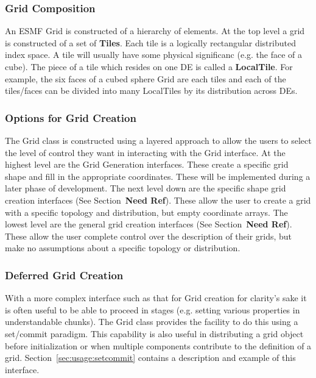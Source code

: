 \subsubsection{Grid Composition}
\label{sec:gridcomp}

An ESMF Grid is constructed of a hierarchy of elements. At the top
level a grid is constructed of a set of {\bf Tiles}. Each tile is a logically
rectangular distributed index space. A tile will usually have some
physical significanc (e.g. the face of a cube). The piece of a tile
which resides on one DE is called a {\bf LocalTile}. For example, the six
faces of a cubed sphere Grid are each tiles and each of 
the tiles/faces can be divided into many LocalTiles by its
distribution across DEs. 

\subsubsection{Options for Grid Creation} 

The Grid class is constructed using a layered approach to allow the 
users to select the level of control they want in interacting with
the Grid interface. At the highest level are the Grid Generation interfaces. 
These create a specific grid shape and fill in the appropriate coordinates. 
These will be implemented during a later phase of development. The
next level down are the specific shape grid creation interfaces (See Section~\textbf{Need Ref}). 
These allow the user to create a grid with a specific topology and 
distribution, but empty coordinate arrays. The lowest level are
the general grid creation interfaces (See Section~\textbf{Need Ref}). These allow the user
complete control over the description of their grids, but
make no assumptions about a specific topology or distribution. 

\subsubsection{Deferred Grid Creation}
 With a more complex interface such as that for Grid creation
for clarity's sake it is often useful to be able to proceed in stages
(e.g. setting various properties in understandable chunks). The 
Grid class provides the facility to do this using a set/commit paradigm.
This capability is also useful in distributing a grid object before
initialization or when multiple components contribute to the 
definition of a grid. Section~\ref{sec:usage:setcommit}
contains a description and example of this interface. 

